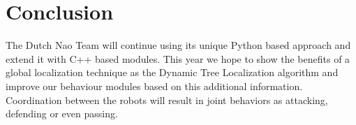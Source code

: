 \documentclass[11pt]{article}
\begin{document}
\section{Conclusion}
The Dutch Nao Team will continue using its unique Python based approach and extend it with C++ based modules. This year we hope to show the benefits of a global localization technique as the Dynamic Tree Localization algorithm and improve our behaviour modules based on this additional information.
Coordination between the robots will result in joint behaviors as attacking, defending or even passing.

 
\end{document}
